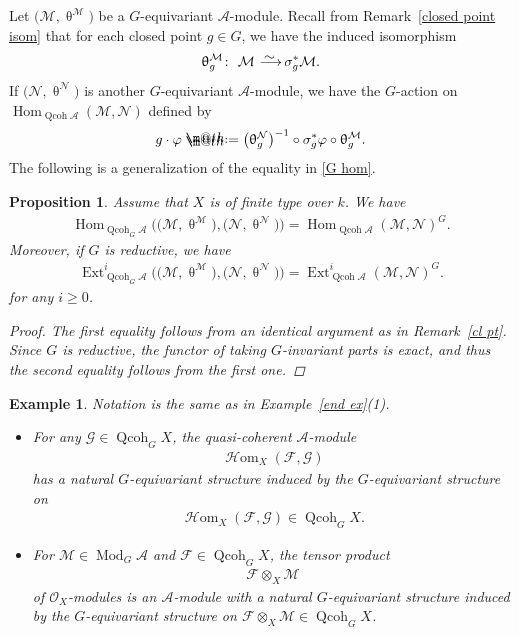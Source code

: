 \documentclass[11pt]{article}
\makeatletter
\numberwithin{equation}{section}
\newtheorem{exa}[dfn]{Example}
\newtheorem{prop}[dfn]{Proposition}
\newcommand*{\defeq}{\mathrel{\rlap{%
 \raisebox{0.3ex}{$\m@th\cdot$}}%
 \raisebox{-0.3ex}{$\m@th\cdot$}}%
 =}
\numberwithin{equation}{section}
\newcommand{\Hom}{\operatorname{Hom}}
\newcommand{\cHom}{\operatorname{{\mathcal H}om}}
\newcommand{\Ext}{\operatorname{Ext}}
\newcommand{\Qcoh}{\operatorname{Qcoh}}
\newcommand{\Mod}{\operatorname{Mod}}
\newcommand{\cA}{\mathcal{A}}
\newcommand{\cF}{\mathcal{F}}
\newcommand{\cG}{\mathcal{G}}
\newcommand{\cM}{\mathcal{M}}
\newcommand{\cN}{\mathcal{N}}
\newcommand{\cO}{\mathcal{O}}
\newcommand{\simto}{\,\,\,\,\raisebox{4pt}{$\sim$}{\kern -1.1em \longrightarrow}\,}
\makeatother
\begin{document}
Let $\big(\cM,\uptheta^{\cM}\big)$ be a $G$-equivariant $\cA$-module. Recall from Remark~\ref{closed point isom} that for each closed point $g\in G$, we have the induced isomorphism
\begin{gather*}
\uptheta_g^{\cM}\colon\ \cM\simto \sigma_g^*\cM.
\end{gather*}
If $\big(\cN,\uptheta^{\cN}\big)$ is another $G$-equivariant $\cA$-module, we have the $G$-action on $\Hom_{\Qcoh\cA}(\cM,\cN)$ defined by
\begin{gather*}
g\cdot\varphi\defeq\big(\uptheta^{\cN}_g\big)^{-1}\circ\sigma_g^*\varphi\circ\uptheta^{\cM}_g.
\end{gather*}
The following is a generalization of the equality in \eqref{G hom}.
\begin{prop}\label{G hom 2}
Assume that $X$ is of finite type over $k$. We have
\begin{gather*}
\Hom_{\Qcoh_G\cA}\big(\big(\cM,\uptheta^{\cM}\big),\big(\cN,\uptheta^{\cN}\big)\big) =\Hom_{\Qcoh\cA}(\cM,\cN)^G.
\end{gather*}
Moreover, if $G$ is reductive, we have
\begin{gather*}
\Ext_{\Qcoh_G\cA}^i\big(\big(\cM,\uptheta^{\cM}\big),\big(\cN,\uptheta^{\cN}\big)\big) =\Ext_{\Qcoh\cA}^i(\cM,\cN)^G.
\end{gather*}
for any $i\geq0$.
\begin{proof}
The first equality follows from an identical argument as in Remark~\ref{cl pt}. Since $G$ is reductive, the functor
of taking $G$-invariant parts is exact, and thus the second equality follows from the first one.
\end{proof}
\end{prop}

\begin{exa} %
Notation is the same as in Example~\ref{end ex}(1).

\begin{itemize}\itemsep=0pt
\item[$1.$] For any $\cG\in \Qcoh_GX$, the quasi-coherent $\cA$-module \begin{gather*}\cHom_X(\cF,\cG)\end{gather*} has a natural $G$-equivariant structure induced by the $G$-equivariant structure on
 \begin{gather*}
 \cHom_X(\cF,\cG)\in \Qcoh_GX.
 \end{gather*}


\item[$2.$] For $\cM\in \Mod_G\cA$ and $\cF\in \Qcoh_GX$, the tensor product \begin{gather*}\cF\otimes_X \cM\end{gather*} of $\cO_X$-modules is an $\cA$-module with a natural $G$-equivariant structure induced by the $G$-equivariant structure on $\cF\otimes_X \cM\in \Qcoh_GX$.
\end{itemize}
\end{exa}
\end{document}
